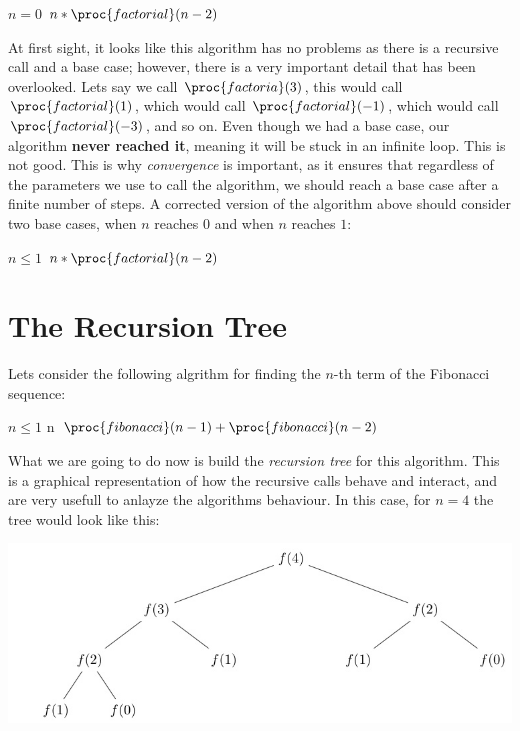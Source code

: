 \documentclass{article}
\begin{document}
\begin{codebox}
\li \If $n = 0$
	\li \Then 
	\End
\li \Return $n * \proc{factorial}(n - 2)$
\end{codebox}

At first sight, it looks like this algorithm has no problems as there is a recursive call and a base case; however, there is a very important detail that has been overlooked. Lets say we call $\proc{factoria}(3)$, this would call $\proc{factorial}(1)$, which would call $\proc{factorial}(-1)$, which would call $\proc{factorial}(-3)$, and so on. Even though we had a base case, our algorithm \textbf{never reached it}, meaning it will be stuck in an infinite loop. This is not good. This is why \textit{convergence} is important, as it ensures that regardless of the parameters we use to call the algorithm, we should reach a base case after a finite number of steps. A corrected version of the algorithm above should consider two base cases, when $n$ reaches $0$ and when $n$ reaches $1$:

\begin{codebox}
\li \If $n \leq 1$
	\li \Then 
	\End
\li \Return $n * \proc{factorial}(n - 2)$
\end{codebox}

\section{The Recursion Tree}

Lets consider the following algrithm for finding the $n$-th term of the Fibonacci sequence:

\begin{codebox}
\li \If $n \leq 1$
	\li \Then 
		\Return n
	\End
\li \Return $\proc{fibonacci}(n - 1) + \proc{fibonacci}(n - 2)$
\end{codebox}

What we are going to do now is build the \textit{recursion tree} for this algorithm. This is a graphical representation of how the recursive calls behave and interact, and are very usefull to anlayze the algorithms behaviour. In this case, for $n = 4$ the tree would look like this:

\begin{center}
	\includegraphics[width=0.8\linewidth]{images/fibtree}
\end{center}
\end{document}
